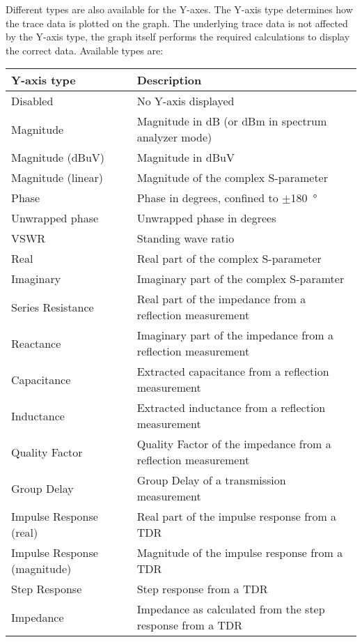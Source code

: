 \documentclass[a4paper,11pt]{article}
\begin{document}
Different types are also available for the Y-axes. The Y-axis type determines how the trace data is plotted on the graph. The underlying trace data is not affected by the Y-axis type, the graph itself performs the required calculations to display the correct data. Available types are:
\begin{center}
\begin{threeparttable}
\begin{tabularx}{\textwidth}{L{5cm}|X}
    \toprule
    \textbf{Y-axis type} & \textbf{Description} \\
    \hline
    Disabled & No Y-axis displayed \\
    \hline
    Magnitude & Magnitude in dB (or dBm in spectrum analyzer mode) \\
    \hline
    Magnitude (dBuV) & Magnitude in dBuV \\
    \hline
    Magnitude (linear) & Magnitude of the complex S-parameter\\
    \hline
    Phase & Phase in degrees, confined to $\pm$\SI{180}{\degree}\\
    \hline
    Unwrapped phase & Unwrapped phase in degrees\\
    \hline
    VSWR & Standing wave ratio\\
    \hline
    Real & Real part of the complex S-parameter\\
    \hline
    Imaginary & Imaginary part of the complex S-paramter\\
    \hline
    Series Resistance & Real part of the impedance from a reflection measurement\\
    \hline
    Reactance & Imaginary part of the impedance from a reflection measurement\\
    \hline
     Capacitance & Extracted capacitance from a reflection measurement\\ 
 \hline
        	 Inductance & Extracted inductance from a reflection measurement\\ 
\hline
        Quality Factor	& Quality Factor of the impedance from a reflection measurement\\ 
\hline
        Group Delay & Group Delay of a transmission measurement\\ 
\hline
        Impulse Response (real)	& Real part of the impulse response from a TDR\\ 
\hline
        Impulse Response (magnitude) & Magnitude of the impulse response from a TDR\\ 
\hline
        Step Response &  Step response from a TDR\\ 
\hline
        Impedance	& Impedance as calculated from the step response from a TDR\\ 
      \bottomrule
\end{tabularx}
\end{threeparttable}
\end{center}
\end{document}
